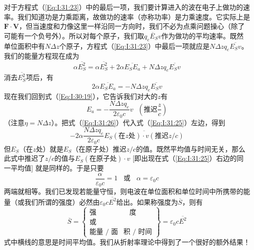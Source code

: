 对于方程式（\ref{Eq:I:31:23}）中的最后一项，我们要计算进入的波在电子上做功的速率。我们知道功是力乘距离，故做功的速率（亦称功率）是力乘速度。它实际上是$\boldsymbol{F}\cdot\boldsymbol{V}$，但当速度和力像这里一样沿同一方向时，我们不必为点乘问题操心（除了可能有一个负号外）。所以对每个原子，我们取$\overline{q_eE_Sv}$作为做功的平均速率。既然单位面积中有$N\Delta z$个原子，方程式（\ref{Eq:I:31:23}）中最后一项就应是$N\Delta zq_e\overline{E_Sv}$。我们的能量方程现在成为
\begin{equation}
    \label{Eq:I:31:24}
    \alpha\overline{E_S^2} = \alpha\overline{E_S^2} + 2\alpha\overline{E_SE_a} + N\Delta zq_e\overline{E_Sv}
\end{equation}
消去$\overline{E_S^2}$项后，有
\begin{equation}
    \label{Eq:I:31:25}
    2\alpha\overline{E_SE_a} = -N\Delta zq_e\overline{E_Sv}
\end{equation}
现在我们回到式（\ref{Eq:I:30:19}），它告诉我们对大的$z$有
\begin{equation}
    \label{Eq:I:31:26}
    E_a = -\frac{N\Delta zq_e}{2\varepsilon_0 c}v ~~~\left (\text{推迟}\frac{z}{c} \right )
\end{equation}
（注意$\eta=N\Delta z$）。把式（\ref{Eq:I:31:26}）代入式（\ref{Eq:I:31:25}）左边，得到
\begin{equation*}
    -2\alpha\frac{N\Delta zq_e}{2\varepsilon_0 c}\overline{E_S(\text{在$z$处})\cdot v(\text{推迟}z/c)}
\end{equation*}
但$E_S$（在$z$处）就是$E_S$（在原子处）推迟$z/c$的值。既然平均值与时间无关，那么此式中推迟了$z/c$的值与$\overline{E_S(\text{在原子处})\cdot v}$ [即出现在式（\ref{Eq:I:31:25}）右边的同一平均值] 就是同样的。于是只要
\begin{equation}
    \label{Eq:I:31:27}
    \frac{\alpha}{\varepsilon_0 c} = 1 ~~~~\text{或}~~~~ \alpha=\varepsilon_0 c
\end{equation}
两端就相等。我们已发现若能量守恒，则电波在单位面积和单位时间中所携带的能量（或我们所谓的强度）必然由$\varepsilon_0c\overline{E^2}$给出。如果称强度为$\overline{S}$，则有
\begin{equation}
    \label{Eq:I:31:28}
    \overline{S} = \left\{
        \begin{aligned}
        \text{强}~~~~~~~~&~~~~\text{度} \\
        \text{或}& \\
        \text{能量 / 面}&\text{积 / 时间}
        \end{aligned}
        \right\} = \varepsilon_0c\overline{E^2}
\end{equation}
式中横线的意思是时间平均值。我们从折射率理论中得到了一个很好的额外结果！

